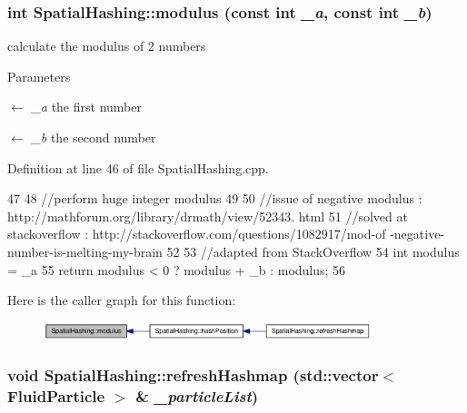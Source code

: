 \hypertarget{class_spatial_hashing_a810e4bfd1e5ec0869dfa3bdefd3a1d42}{
\subsubsection[{modulus}]{\setlength{\rightskip}{0pt plus 5cm}int SpatialHashing::modulus (const int {\em \_\-a}, \/  const int {\em \_\-b})}}
\label{class_spatial_hashing_a810e4bfd1e5ec0869dfa3bdefd3a1d42}


calculate the modulus of 2 numbers 


\begin{DoxyParams}{Parameters}
\item[\mbox{$\leftarrow$} {\em \_\-a}]the first number \item[\mbox{$\leftarrow$} {\em \_\-b}]the second number \end{DoxyParams}


Definition at line 46 of file SpatialHashing.cpp.




\begin{DoxyCode}
47 {
48     //perform huge integer modulus
49 
50     //issue of negative modulus : http://mathforum.org/library/drmath/view/52343.
      html
51     //solved at stackoverflow : http://stackoverflow.com/questions/1082917/mod-of
      -negative-number-is-melting-my-brain
52 
53     //adapted from StackOverflow
54     int modulus = _a %
55     return modulus < 0 ? modulus + _b : modulus;
56 }
\end{DoxyCode}




Here is the caller graph for this function:\nopagebreak
\begin{figure}[H]
\begin{center}
\leavevmode
\includegraphics[width=271pt]{class_spatial_hashing_a810e4bfd1e5ec0869dfa3bdefd3a1d42_icgraph}
\end{center}
\end{figure}


\hypertarget{class_spatial_hashing_acd1b87ec8ea289a18d431b7a3fde50c0}{
\subsubsection[{refreshHashmap}]{\setlength{\rightskip}{0pt plus 5cm}void SpatialHashing::refreshHashmap (std::vector$<$ {\bf FluidParticle} $>$ \& {\em \_\-particleList})}}
\label{class_spatial_hashing_acd1b87ec8ea289a18d431b7a3fde50c0}


